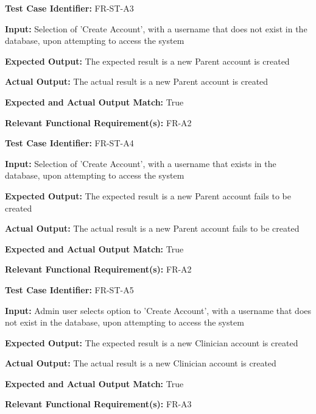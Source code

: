 \documentclass[12pt, titlepage]{article}
\begin{document}
\begin{mdframed}[linewidth=0.5mm] \par
  \textbf{Test Case Identifier:} FR-ST-A3 \par
  \textbf{Input:} Selection of 'Create Account', with a username that does not exist in the database, upon attempting to access the system \par
  \textbf{Expected Output:} The expected result is a new Parent account is created \par
  \textbf{Actual Output:} The actual result is a new Parent account is created \par
  \textbf{Expected and Actual Output Match:} True \par
  \textbf{Relevant Functional Requirement(s):} FR-A2
\end{mdframed}

\begin{mdframed}[linewidth=0.5mm] \par
  \textbf{Test Case Identifier:} FR-ST-A4 \par
  \textbf{Input:} Selection of 'Create Account', with a username that exists in the database, upon attempting to access the system \par
  \textbf{Expected Output:} The expected result is a new Parent account fails to be created \par
  \textbf{Actual Output:} The actual result is a new Parent account fails to be created \par
  \textbf{Expected and Actual Output Match:} True \par
  \textbf{Relevant Functional Requirement(s):} FR-A2
\end{mdframed}

\begin{mdframed}[linewidth=0.5mm] \par
  \textbf{Test Case Identifier:} FR-ST-A5 \par
  \textbf{Input:} Admin user selects option to ’Create Account’, with a username that does
  not exist in the database, upon attempting to access the system \par
  \textbf{Expected Output:} The expected result is a new Clinician account is created \par
  \textbf{Actual Output:} The actual result is a new Clinician account is created \par
  \textbf{Expected and Actual Output Match:} True \par
  \textbf{Relevant Functional Requirement(s):} FR-A3
\end{mdframed}
\end{document}
